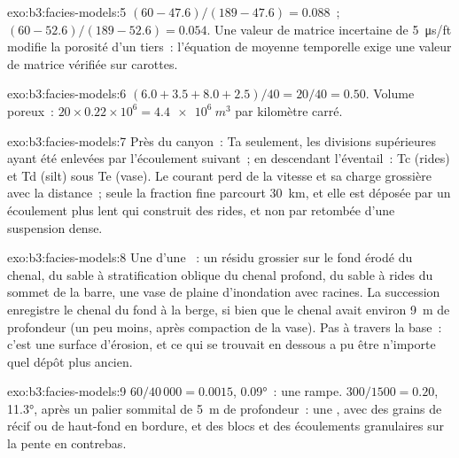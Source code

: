 \begin{solution}{exo:b3:facies-models:5}
$(60 - 47.6)/(189 - 47.6) = 0.088$~; $(60 - 52.6)/(189 - 52.6) = 0.054$. Une
valeur de matrice incertaine de \qty{5}{\micro\second/ft} modifie la porosité
d'un tiers~: l'équation de moyenne temporelle exige une valeur de matrice vérifiée sur carottes.
\end{solution}

\begin{solution}{exo:b3:facies-models:6}
$(6.0 + 3.5 + 8.0 + 2.5)/40 = 20/40 = 0.50$. Volume poreux~: $20\times0.22
\times10^6 = \qty{4.4e6}{m^3}$ par kilomètre carré.
\end{solution}

\begin{solution}{exo:b3:facies-models:7}
Près du canyon~: Ta seulement, les divisions supérieures ayant été enlevées par l'écoulement suivant~; en descendant
l'éventail~: Tc (rides) et Td (silt) sous Te (vase). Le courant perd de la vitesse
et sa charge grossière avec la distance~; seule la fraction fine parcourt
\qty{30}{km}, et elle est déposée par un écoulement plus lent qui construit
des rides, et non par retombée d'une suspension dense.
\end{solution}

\begin{solution}{exo:b3:facies-models:8}
Une  d'une ~: un résidu grossier sur le fond érodé du chenal,
du sable à stratification oblique du chenal profond, du sable à rides du sommet de la barre,
une vase de plaine d'inondation avec racines. La succession enregistre le chenal du fond à
la berge, si bien que le chenal avait environ \qty{9}{m} de profondeur (un peu moins, après
compaction de la vase). Pas à travers la base~: c'est une surface d'érosion, et
ce qui se trouvait en dessous a pu être n'importe quel dépôt plus ancien.
\end{solution}

\begin{solution}{exo:b3:facies-models:9}
$60/40\,000 = 0.0015$, \ang{0.09}~: une rampe. $300/1500 = 0.20$, \ang{11.3},
après un palier sommital de \qty{5}{m} de profondeur~: une , avec des grains de récif ou de haut-fond
en bordure, et des blocs et des écoulements granulaires sur la pente en contrebas.
\end{solution}

